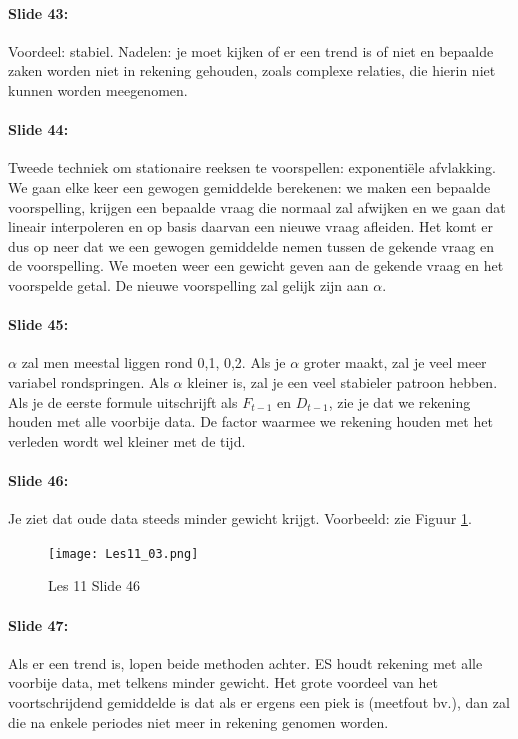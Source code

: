 \documentclass[10pt,a4paper]{report}
\begin{document}
\paragraph{Slide 43:} Voordeel: stabiel. Nadelen: je moet kijken of er een trend is of niet en bepaalde zaken worden niet in rekening gehouden, zoals complexe relaties, die hierin niet kunnen worden meegenomen.

\paragraph{Slide 44:} Tweede techniek om stationaire reeksen te voorspellen: exponenti\"ele afvlakking. We gaan elke keer een gewogen gemiddelde berekenen: we maken een bepaalde voorspelling, krijgen een bepaalde vraag die normaal zal afwijken en we gaan dat lineair interpoleren en op basis daarvan een nieuwe vraag afleiden. Het komt er dus op neer dat we een gewogen gemiddelde nemen tussen de gekende vraag en de voorspelling. We moeten weer een gewicht geven aan de gekende vraag en het voorspelde getal. De nieuwe voorspelling zal gelijk zijn aan $\alpha$. 

\paragraph{Slide 45:} $\alpha$ zal men meestal liggen rond 0,1, 0,2. Als je $\alpha$ groter maakt, zal je veel meer variabel rondspringen. Als $\alpha$ kleiner is, zal je een veel stabieler patroon hebben. Als je de eerste formule uitschrijft als $F_{t-1}$ en $D_{t-1}$, zie je dat we rekening houden met alle voorbije data. De factor waarmee we rekening houden met het verleden wordt wel kleiner met de tijd. 

\paragraph{Slide 46:} Je ziet dat oude data steeds minder gewicht krijgt.
Voorbeeld: zie Figuur \ref{les11_03}.

\begin{figure}[h!]
\centering
\texttt{[image: Les11\_03.png]}
\caption{Les 11 Slide 46} 
\label{les11_03}
\end{figure}

\paragraph{Slide 47:} Als er een trend is, lopen beide methoden achter. ES houdt rekening met alle voorbije data, met telkens minder gewicht. Het grote voordeel van het voortschrijdend gemiddelde is dat als er ergens een piek is (meetfout bv.), dan zal die na enkele periodes niet meer in rekening genomen worden. 
\end{document}

